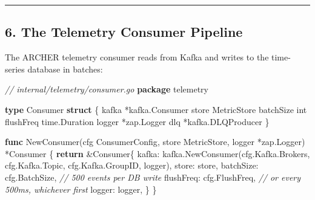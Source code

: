 \documentclass[
]{article}
\newenvironment{Shaded}{}{}
\newcommand{\CommentTok}[1]{\textcolor[rgb]{0.38,0.63,0.69}{\textit{#1}}}
\newcommand{\ControlFlowTok}[1]{\textcolor[rgb]{0.00,0.44,0.13}{\textbf{#1}}}
\newcommand{\DataTypeTok}[1]{\textcolor[rgb]{0.56,0.13,0.00}{#1}}
\newcommand{\KeywordTok}[1]{\textcolor[rgb]{0.00,0.44,0.13}{\textbf{#1}}}
\newcommand{\NormalTok}[1]{#1}
\newcommand{\OperatorTok}[1]{\textcolor[rgb]{0.40,0.40,0.40}{#1}}
\begin{document}
\begin{center}\rule{0.5\linewidth}{0.5pt}\end{center}

\hypertarget{the-telemetry-consumer-pipeline}{%
\subsection{6. The Telemetry Consumer
Pipeline}\label{the-telemetry-consumer-pipeline}}

The ARCHER telemetry consumer reads from Kafka and writes to the
time-series database in batches:

\begin{Shaded}
\begin{Highlighting}[]
\CommentTok{// internal/telemetry/consumer.go}
\KeywordTok{package}\NormalTok{ telemetry}

\KeywordTok{type}\NormalTok{ Consumer }\KeywordTok{struct} \OperatorTok{\{}
\NormalTok{    kafka     }\OperatorTok{*}\NormalTok{kafka}\OperatorTok{.}\NormalTok{Consumer}
\NormalTok{    store     MetricStore}
\NormalTok{    batchSize }\DataTypeTok{int}
\NormalTok{    flushFreq time}\OperatorTok{.}\NormalTok{Duration}
\NormalTok{    logger    }\OperatorTok{*}\NormalTok{zap}\OperatorTok{.}\NormalTok{Logger}
\NormalTok{    dlq       }\OperatorTok{*}\NormalTok{kafka}\OperatorTok{.}\NormalTok{DLQProducer}
\OperatorTok{\}}

\KeywordTok{func}\NormalTok{ NewConsumer}\OperatorTok{(}\NormalTok{cfg ConsumerConfig}\OperatorTok{,}\NormalTok{ store MetricStore}\OperatorTok{,}\NormalTok{ logger }\OperatorTok{*}\NormalTok{zap}\OperatorTok{.}\NormalTok{Logger}\OperatorTok{)} \OperatorTok{*}\NormalTok{Consumer }\OperatorTok{\{}
    \ControlFlowTok{return} \OperatorTok{\&}\NormalTok{Consumer}\OperatorTok{\{}
\NormalTok{        kafka}\OperatorTok{:}\NormalTok{     kafka}\OperatorTok{.}\NormalTok{NewConsumer}\OperatorTok{(}\NormalTok{cfg}\OperatorTok{.}\NormalTok{Kafka}\OperatorTok{.}\NormalTok{Brokers}\OperatorTok{,}\NormalTok{ cfg}\OperatorTok{.}\NormalTok{Kafka}\OperatorTok{.}\NormalTok{Topic}\OperatorTok{,}\NormalTok{ cfg}\OperatorTok{.}\NormalTok{Kafka}\OperatorTok{.}\NormalTok{GroupID}\OperatorTok{,}\NormalTok{ logger}\OperatorTok{),}
\NormalTok{        store}\OperatorTok{:}\NormalTok{     store}\OperatorTok{,}
\NormalTok{        batchSize}\OperatorTok{:}\NormalTok{ cfg}\OperatorTok{.}\NormalTok{BatchSize}\OperatorTok{,}   \CommentTok{// 500 events per DB write}
\NormalTok{        flushFreq}\OperatorTok{:}\NormalTok{ cfg}\OperatorTok{.}\NormalTok{FlushFreq}\OperatorTok{,}   \CommentTok{// or every 500ms, whichever first}
\NormalTok{        logger}\OperatorTok{:}\NormalTok{    logger}\OperatorTok{,}
    \OperatorTok{\}}
\OperatorTok{\}}


\end{Highlighting}
\end{Shaded}
\end{document}
